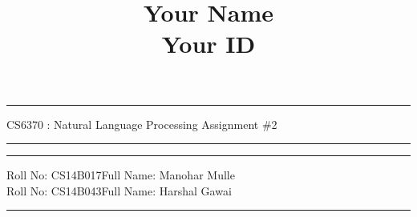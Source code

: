 \documentclass[11pt]{exam}
\title{Your Name\\ Your ID}
\author{}
\date{}
\begin{document}
\hrule
\vspace{3mm}
\noindent
{\sf CS6370 : Natural Language Processing  \hfill Assignment \#2 }
\vspace{3mm}
\noindent
\hrule


\hrule
\vspace{3mm}
\noindent
{\sf Roll No: CS14B017\hfill Full Name: Manohar Mulle} 
\vspace{3mm}\\
\noindent
{\sf Roll No: CS14B043\hfill Full Name: Harshal Gawai} 
\vspace{3mm}
\hrule
\end{document}
